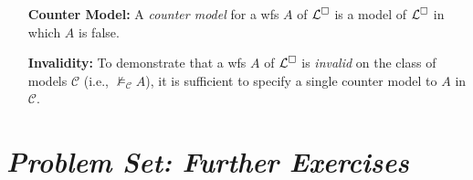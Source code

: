 \documentclass[a4paper, 11pt]{article} %
\begin{document}
\begin{enumerate}[leftmargin=1.2in]
\begin{enumerate}
		      \item[$(S4)$] The system $S4$ is sound and complete over the reflexive and transitive models $\mathcal{C}_{S4}=\mathcal{C}_r\bigcap\mathcal{C}_t$, i.e., $\vdash_{S4} A$ if and only if $\vDash_{\mathcal{C}_{S4}} A$.\footnote{The intersection $X\bigcap Y$ is the set of elements in both $X$ and $Y$, i.e., $X\bigcap Y=\set{z:z\in X ~\text{and}~ z\in Y}$.}
		      \item[$(S5)$] The modal system $S5$ is sound and complete over the class of all reflexive, symmetric, and transitive models $\mathcal{C}_{S5}=\mathcal{C}_r\bigcap\mathcal{C}_s\bigcap\mathcal{C}_t$, i.e., $\vdash_{S5} A$ if and only if $\vDash_{\mathcal{C}_{S5}} A$.\footnote{See \citet{Hughes1996} for proofs of soundness and completeness for $K,T,S4$, and $S5$.}
	      \end{enumerate}
	\item[\bf Counter Model:] A \textit{counter model} for a wfs $A$ of $\mathcal{L}^{\square}$ is a model of $\mathcal{L}^{\square}$ in which $A$ is false.
	\item[\bf Invalidity:] To demonstrate that a wfs $A$ of $\mathcal{L}^{\square}$ is \textit{invalid} on the class of models $\mathcal{C}$ (i.e., $\nvDash_\mathcal{C} A$), it is sufficient to specify a single counter model to $A$ in $\mathcal{C}$.
\end{enumerate}




\section*{\it Problem Set: Further Exercises}
\end{document}
